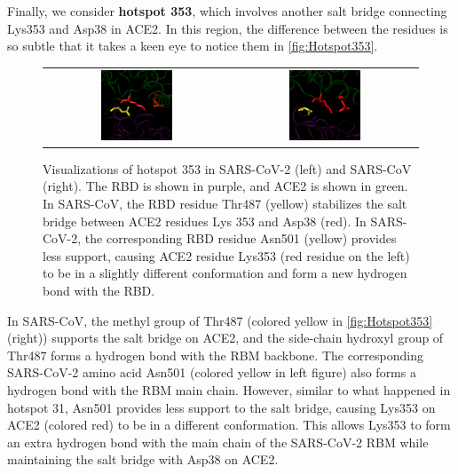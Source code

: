 Finally, we consider \textbf{hotspot 353}, which involves another salt bridge connecting Lys353 and Asp38 in ACE2. In this region, the difference between the residues is so subtle that it takes a keen eye to notice them in \autoref{fig:Hotspot353}.

\begin{figure}[h]
	\centering
	\mySfFamily
	\begin{tabular}{c c}
	\includegraphics[width = 0.4\textwidth]{../images/Hotspot353_SARS-2.png} & \includegraphics[width = 0.4\textwidth]{../images/Hotspot353_SARS.png}
	\end{tabular}
	\caption{Visualizations of hotspot 353 in SARS-CoV-2 (left) and SARS-CoV (right). The RBD is shown in purple, and ACE2 is shown in green. In SARS-CoV, the RBD residue Thr487 (yellow) stabilizes the salt bridge between ACE2 residues Lys 353 and Asp38 (red). In SARS-CoV-2, the corresponding RBD residue Asn501 (yellow) provides less support, causing ACE2 residue Lys353 (red residue on the left) to be in a slightly different conformation and form a new hydrogen bond with the RBD.}
	\label{fig:Hotspot353}
\end{figure}

In SARS-CoV, the methyl group of Thr487 (colored yellow in \autoref{fig:Hotspot353} (right)) supports the salt bridge on ACE2, and the side-chain hydroxyl group of Thr487 forms a hydrogen bond with the RBM backbone. The corresponding SARS-CoV-2 amino acid Asn501 (colored yellow in left figure) also forms a hydrogen bond with the RBM main chain. However, similar to what happened in hotspot 31, Asn501 provides less support to the salt bridge, causing Lys353 on ACE2 (colored red) to be in a different conformation. This allows Lys353 to form an extra hydrogen bond with the main chain of the SARS-CoV-2 RBM while maintaining the salt bridge with Asp38 on ACE2.

